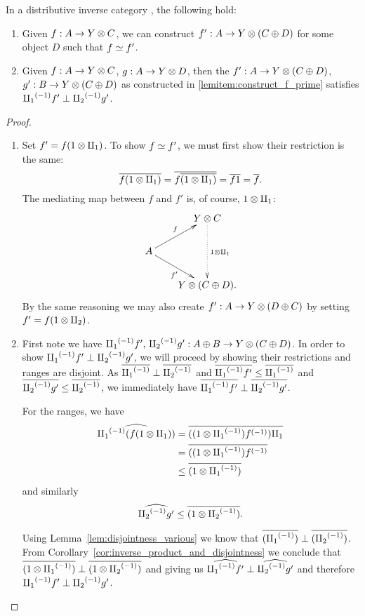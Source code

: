 \begin{lemma}\label{lem:maps_from_disjoint_sums_have_disjoint_equivalences}
  In a distributive inverse category \X, the following hold:
  \begin{enumerate}[{(}i{)}]
    \item Given $f : A \to Y\otimes C$, we can construct $f' : A \to Y \otimes (C\oplus D)$  for some object $D$ such
      that $f \overset{\scriptscriptstyle }{\simeq} f'$.\label{lemitem:construct_f_prime}
    \item Given $f : A \to Y \otimes C$, $g : A\to Y \otimes D$, then the $f' : A \to Y \otimes (C\oplus D)$,
      $g' : B \to Y \otimes (C\oplus D)$ as constructed in  \ref{lemitem:construct_f_prime} satisfies ${\amalg_{1}}^{(-1)} f'
      \perp {\amalg_{2}}^{(-1)} g'$.\label{lemitem:constructed_are_disjoint}
  \end{enumerate}
\end{lemma}
\begin{proof}
  \prepprooflist
  \begin{enumerate}[{(}i{)}]
  \item Set $f' = f(1\otimes\amalg_{1})$.
    To show $f\overset{\scriptscriptstyle }{\simeq} f'$, we must first show their restriction is the same:
    \[
      \overline{f(1\otimes\amalg_{1})} = \overline{f\overline{(1\otimes\amalg_{1})}} = \overline{f 1} =  \overline{f}.
    \]
    The mediating map between $f$ and $f'$ is, of course, $1\otimes\amalg_{1}$:
    \[
    \xymatrix @C=20pt @R=20pt{
      &  Y \* C \ar@{.>}[dd]^{1\*\cpa}\\
      A \ar[ur]^f \ar[dr]_{f'} \\
      & Y\*(C\+ D).
    }
    \]
  By the same reasoning we may also create $f':A\to Y\otimes(D\oplus C)$ by setting $f' = f(1\otimes\amalg_{2})$.
  \item First note we have ${\amalg_{1}}^{(-1)} f',\,{\amalg_{2}}^{(-1)} g': A\oplus B \to Y\otimes(C\oplus D)$. In order to show  ${\amalg_{1}}^{(-1)} f'
    \perp {\amalg_{2}}^{(-1)} g'$, we will proceed by showing their restrictions and ranges are disjoint.
    As $\overline{{\amalg_{1}}^{(-1)}} \perp \overline{{\amalg_{2}}^{(-1)}}$ and $\overline{{\amalg_{1}}^{(-1)}f'} \le \overline{{\amalg_{1}}^{(-1)}}$ and
    $\overline{{\amalg_{2}}^{(-1)}g'} \le \overline{{\amalg_{2}}^{(-1)}}$, we immediately have
    $\overline{{\amalg_{1}}^{(-1)}f'} \perp \overline{{\amalg_{2}}^{(-1)}g'}$.

    For the ranges, we have
    \begin{align*}
      \widehat{{\amalg_{1}}^{(-1)} (f (1\otimes\amalg_{1}))} &=
      \overline{((1\otimes{\amalg_{1}}^{(-1)}){f}^{(-1)})\amalg_{1}}\\
      &= \overline{((1\otimes{\amalg_{1}}^{(-1)}){f}^{(-1)}}\\
      &\le \overline{(1\otimes{\amalg_{1}}^{(-1)})}
    \end{align*}
    and similarly
    \[
      \widehat{{\amalg_{2}}^{(-1)} g'} \le \overline{(1\otimes{\amalg_{2}}^{(-1)})}.
    \]

    Using Lemma~\ref{lem:disjointness_various}
    we know that $\overline{({\amalg_{1}}^{(-1)})}\perp \overline{({\amalg_{2}}^{(-1)})}$. From
    Corollary~\ref{cor:inverse_product_and_disjointness}
    we conclude that $\overline{(1\otimes{\amalg_{1}}^{(-1)})}\perp \overline{(1\otimes{\amalg_{2}}^{(-1)})}$ and giving us
    $\widehat{{\amalg_{1}}^{(-1)}f'} \perp \widehat{{\amalg_{2}}^{(-1)}g'}$ and therefore ${\amalg_{1}}^{(-1)}f' \perp {\amalg_{2}}^{(-1)}g'$.
  \end{enumerate}
\end{proof}
